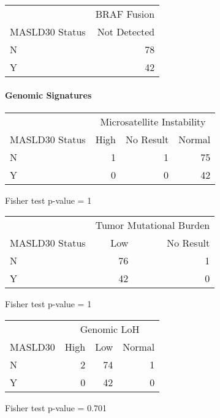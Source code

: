 \documentclass[
]{article}
\begin{document}
\begingroup
\fontsize{12.0pt}{14.4pt}\selectfont
\begin{longtable}{l|r}
\toprule
 & BRAF Fusion \\ 
\cmidrule(lr){2-2}
MASLD30 Status & Not Detected \\ 
\midrule\addlinespace[2.5pt]
N & 78 \\ 
Y & 42 \\ 
\bottomrule
\end{longtable}
\endgroup
\pagebreak

\hypertarget{genomic-signatures}{%
\paragraph{Genomic Signatures}\label{genomic-signatures}}

\begingroup
\fontsize{12.0pt}{14.4pt}\selectfont
\setlength{\LTpost}{0mm}
\begin{longtable}{l|rrr}
\toprule
 & \multicolumn{3}{c}{Microsatellite Instability} \\ 
\cmidrule(lr){2-4}
MASLD30 Status & High & No Result & Normal \\ 
\midrule\addlinespace[2.5pt]
N & 1 & 1 & 75 \\ 
Y & 0 & 0 & 42 \\ 
\bottomrule
\end{longtable}
\begin{minipage}{\linewidth}
Fisher test p-value =  1\\
\end{minipage}
\endgroup

\begingroup
\fontsize{12.0pt}{14.4pt}\selectfont
\setlength{\LTpost}{0mm}
\begin{longtable}{l|rr}
\toprule
 & \multicolumn{2}{c}{Tumor Mutational Burden} \\ 
\cmidrule(lr){2-3}
MASLD30 Status & Low & No Result \\ 
\midrule\addlinespace[2.5pt]
N & 76 & 1 \\ 
Y & 42 & 0 \\ 
\bottomrule
\end{longtable}
\begin{minipage}{\linewidth}
Fisher test p-value =  1\\
\end{minipage}
\endgroup

\begingroup
\fontsize{12.0pt}{14.4pt}\selectfont
\setlength{\LTpost}{0mm}
\begin{longtable}{lrrr}
\toprule
 & \multicolumn{3}{c}{Genomic LoH} \\ 
\cmidrule(lr){2-4}
MASLD30 & High & Low & Normal \\ 
\midrule\addlinespace[2.5pt]
N & 2 & 74 & 1 \\ 
Y & 0 & 42 & 0 \\ 
\bottomrule
\end{longtable}
\begin{minipage}{\linewidth}
Fisher test p-value =  0.701\\
\end{minipage}
\endgroup
\pagebreak
\end{document}
